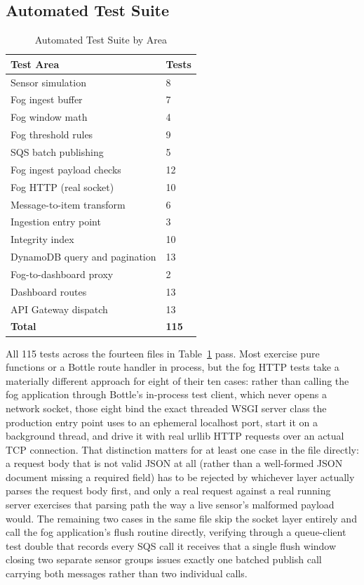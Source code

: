 \documentclass[conference]{IEEEtran}
\begin{document}
\subsection{Automated Test Suite}

\begin{table}[!t]
\caption{Automated Test Suite by Area}
\label{tab:tests}
\centering
\footnotesize
\begin{tabular}{p{2.2in}p{0.5in}}
\hline
\textbf{Test Area} & \textbf{Tests} \\
\hline
Sensor simulation & 8 \\
Fog ingest buffer & 7 \\
Fog window math & 4 \\
Fog threshold rules & 9 \\
SQS batch publishing & 5 \\
Fog ingest payload checks & 12 \\
Fog HTTP (real socket) & 10 \\
Message-to-item transform & 6 \\
Ingestion entry point & 3 \\
Integrity index & 10 \\
DynamoDB query and pagination & 13 \\
Fog-to-dashboard proxy & 2 \\
Dashboard routes & 13 \\
API Gateway dispatch & 13 \\
\hline
\textbf{Total} & \textbf{115} \\
\hline
\end{tabular}
\end{table}

All 115 tests across the fourteen files in Table~\ref{tab:tests} pass. Most exercise pure functions or a Bottle route handler in process, but the fog HTTP tests take a materially different approach for eight of their ten cases: rather than calling the fog application through Bottle's in-process test client, which never opens a network socket, those eight bind the exact threaded WSGI server class the production entry point uses to an ephemeral localhost port, start it on a background thread, and drive it with real urllib HTTP requests over an actual TCP connection. That distinction matters for at least one case in the file directly: a request body that is not valid JSON at all (rather than a well-formed JSON document missing a required field) has to be rejected by whichever layer actually parses the request body first, and only a real request against a real running server exercises that parsing path the way a live sensor's malformed payload would. The remaining two cases in the same file skip the socket layer entirely and call the fog application's flush routine directly, verifying through a queue-client test double that records every SQS call it receives that a single flush window closing two separate sensor groups issues exactly one batched publish call carrying both messages rather than two individual calls.
\end{document}
